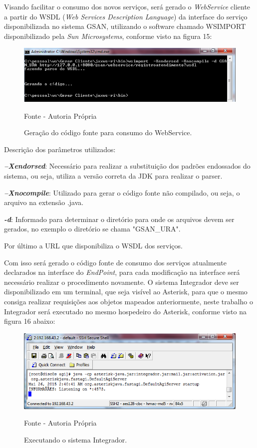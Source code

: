 Visando facilitar o consumo dos novos serviços, será gerado o \textit{WebService} cliente a partir do WSDL (\textit{Web Services Description Language}) da interface do serviço disponibilizada no sistema GSAN, utilizando o software chamado WSIMPORT disponibilizado pela \textit{Sun Microsystems}, conforme visto na figura 15:

\begin{figure}[!htb]
	\centering
	\includegraphics{figuras/gerar_wscliente.png}
	\caption{Geração do código fonte para consumo do WebService.}	
	Fonte - Autoria Própria
\end{figure}

Descrição dos parâmetros utilizados:

\begin{description}
	\item \textbf{\textit{–Xendorsed}}: Necessário para realizar a substituição dos padrões endossados do sistema, ou seja, utiliza a versão correta da JDK para realizar o parser.
	\item \textbf{\textit{–Xnocompile}}: Utilizado para gerar o código fonte não compilado, ou seja, o arquivo na extensão .java.
	\item \textbf{\textit{-d}}: Informado para determinar o diretório para onde os arquivos devem ser gerados, no exemplo o diretório se chama "GSAN\_URA".
	\item Por último a URL que disponibiliza o WSDL dos serviços. 
\end{description}



Com isso será gerado o código fonte de consumo dos serviços atualmente declarados na interface do \textit{EndPoint}, para cada modificação na interface será necessário realizar o procedimento novamente. O sistema Integrador deve ser disponibilizado em um terminal, que seja visível ao Asterisk, para que o mesmo consiga realizar requisições aos objetos mapeados anteriormente, neste trabalho o Integrador será executado no mesmo hospedeiro do Asterisk, conforme visto na figura 16 abaixo:

\begin{figure}[!htb]
	\centering
	\includegraphics{figuras/executar_integrador.png}
	\caption{Executando o sistema Integrador.}	
	Fonte - Autoria Própria
\end{figure}


